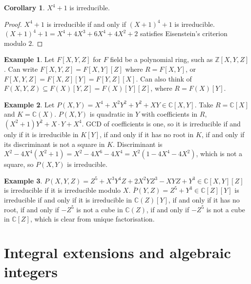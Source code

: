\documentclass{article}
\newcommand{\Z}{\mathbb{Z}}
\newcommand{\C}{\mathbb{C}}
\newcommand{\rb}[1]{\left( #1 \right)}
\renewcommand{\sb}[1]{\left[ #1 \right]}
\theoremstyle{definition}\newtheorem{definition}{Definition}[subsection]
\theoremstyle{definition}\newtheorem{remark}[definition]{Remark}
\theoremstyle{definition}\newtheorem*{example}{Example}
\theoremstyle{definition}\newtheorem*{note}{Note}
\newtheorem{corollary}[definition]{Corollary}
\begin{document}
\begin{corollary}
$ X^4 + 1 $ is irreducible.
\end{corollary}

\begin{proof}
$ X^4 + 1 $ is irreducible if and only if $ \rb{X + 1}^4 + 1 $ is irreducible. $ \rb{X + 1}^4 + 1 = X^4 + 4X^3 + 6X^4 + 4X^2 + 2 $ satisfies Eisenstein's criterion modulo $ 2 $.
\end{proof}


\begin{example}
Let $ F\sb{X, Y, Z} $ for $ F $ field be a polynomial ring, such as $ \Z\sb{X, Y, Z} $. Can write $ F\sb{X, Y, Z} = F\sb{X, Y}\sb{Z} $ where $ R = F\sb{X, Y} $, or $ F\sb{X, Y, Z} = F\sb{X, Z}\sb{Y} = F\sb{Y, Z}\sb{X} $. Can also think of $ F\rb{X, Y, Z} \subseteq F\rb{X}\sb{Y, Z} = F\rb{X}\sb{Y}\sb{Z} $, where $ R = F\rb{X}\sb{Y} $.
\end{example}

\begin{example}
Let $ P\rb{X, Y} = X^4 + X^2Y^2 + Y^2 + XY \in \C\sb{X, Y} $. Take $ R = \C\sb{X} $ and $ K = \C\rb{X} $. $ P\rb{X, Y} $ is quadratic in $ Y $ with coefficients in $ R $, $ \rb{X^2 + 1}Y^2 + X \cdot Y + X^4 $. GCD of coefficients is one, so it is irreducible if and only if it is irreducible in $ K\sb{Y} $, if and only if it has no root in $ K $, if and only if its discriminant is not a square in $ K $. Discriminant is $ X^2 - 4X^4\rb{X^2 + 1} = X^2 - 4X^6 - 4X^4 = X^2\rb{1 - 4X^4 - 4X^2} $, which is not a square, so $ P\rb{X, Y} $ is irreducible.
\end{example}

\begin{example}
$ P\rb{X, Y, Z} = Z^5 + X^3Y^4Z + 2X^2YZ^3 - XYZ + Y^3 \in \C\sb{X, Y}\sb{Z} $ is irreducible if it is irreducible modulo $ X $. $ \bar{P}\rb{Y, Z} = Z^5 + Y^3 \in \C\sb{Z}\sb{Y} $ is irreducible if and only if it is irreducible in $ \C\rb{Z}\sb{Y} $, if and only if it has no root, if and only if $ -Z^5 $ is not a cube in $ \C\rb{Z} $, if and only if $ -Z^5 $ is not a cube in $ \C\sb{Z} $, which is clear from unique factorisation.
\end{example}

\section{Integral extensions and algebraic integers}
\end{document}
